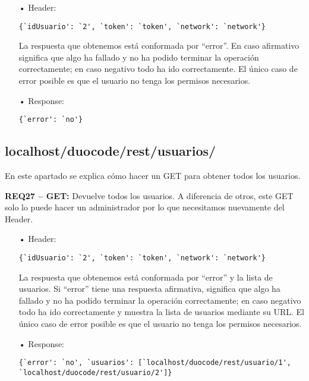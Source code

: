 \begin{itemize}
\item[•]
Header:
{\codesize
\begin{verbatim} 
{`idUsuario': `2', `token': `token', `network': `network'}
\end{verbatim}
}

La respuesta que obtenemos está conformada por ``error''. En caso afirmativo significa que algo ha fallado y no ha podido terminar la operación correctamente; en caso negativo todo ha ido correctamente. El único caso de error posible es que el usuario no tenga los permisos necesarios.

\item[•]
Response: 
{\codesize
\begin{verbatim}
{`error': `no'}
\end{verbatim}
}
\end{itemize}

\subsection{localhost/duocode/rest/usuarios/}
En este apartado se explica cómo hacer un GET para obtener todos los usuarios.
\vspace{1em}

\textbf{REQ27 – GET:} Devuelve todos los usuarios. A diferencia de otros, este GET solo lo puede hacer un administrador por lo que necesitamos nuevamente del Header.

\begin{itemize}
\item[•]
Header:
{\codesize
\begin{verbatim}
{`idUsuario': `2', `token': `token', `network': `network'}
\end{verbatim}
}

La respuesta que obtenemos está conformada por ``error'' y la lista de usuarios. Si ``error'' tiene una respuesta afirmativa, significa que algo ha fallado y no ha podido terminar la operación correctamente; en caso negativo todo ha ido correctamente y muestra la lista de usuarios mediante su URL. El único caso de error posible es que el usuario no tenga los permisos necesarios.

\item[•]
Response: 
{\codesize
\begin{verbatim}
{`error': `no', `usuarios': [`localhost/duocode/rest/usuario/1', 
`localhost/duocode/rest/usuario/2']}
\end{verbatim}
}
\end{itemize}

